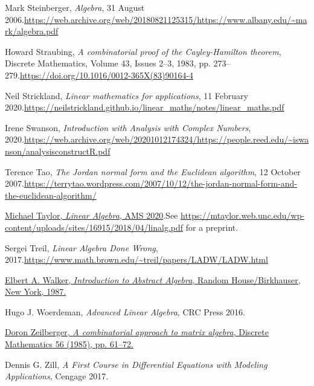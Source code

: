 \documentclass[numbers=enddot,12pt,final,onecolumn,notitlepage]{scrartcl}%
\numberwithin{exer}{subsection}
\theoremstyle{definition}
\begin{document}
\begin{thebibliography}{99999999}
Mark Steinberger, \textit{Algebra}, 31 August
2006.\newline\url{https://web.archive.org/web/20180821125315/https://www.albany.edu/~mark/algebra.pdf}

Howard Straubing, \textit{A combinatorial proof of
the Cayley-Hamilton theorem}, Discrete Mathematics, Volume 43, Issues 2--3,
1983, pp. 273--279.\newline\url{https://doi.org/10.1016/0012-365X(83)90164-4}

Neil Strickland, \textit{Linear mathematics for
applications}, 11 February 2020.\newline\url{https://neilstrickland.github.io/linear_maths/notes/linear_maths.pdf}

Irene Swanson, \textit{Introduction with Analysis
with Complex Numbers}, 2020.\newline\url{https://web.archive.org/web/20201012174324/https://people.reed.edu/~iswanson/analysisconstructR.pdf}

Terence Tao, \textit{The Jordan normal form and the
Euclidean algorithm}, 12 October 2007.\newline\url{https://terrytao.wordpress.com/2007/10/12/the-jordan-normal-form-and-the-euclidean-algorithm/}

%
\href{https://bookstore.ams.org/amstext-45/}{Michael Taylor, \textit{Linear
Algebra}, AMS 2020}.\newline See
\url{https://mtaylor.web.unc.edu/wp-content/uploads/sites/16915/2018/04/linalg.pdf}
for a preprint.

Sergei Treil, \textit{Linear Algebra Done Wrong},
2017.\newline\url{https://www.math.brown.edu/~treil/papers/LADW/LADW.html}

%
\href{https://web.archive.org/web/20170809055317/https://www.math.nmsu.edu/~elbert/AbsAlgeb.pdf}{Elbert
A. Walker, \textit{Introduction to Abstract Algebra}, Random House/Birkhauser,
New York, 1987.}

Hugo J. Woerdeman, \textit{Advanced Linear
Algebra}, CRC Press 2016.

%
\href{http://www.math.rutgers.edu/~zeilberg/mamarimY/DM85.pdf}{Doron
Zeilberger, \textit{A combinatorial approach to matrix algebra}, Discrete
Mathematics 56 (1985), pp. 61--72.}

Dennis G. Zill, \textit{A First Course in Differential
Equations with Modeling Applications}, Cengage 2017.
\end{thebibliography}
\end{document}
